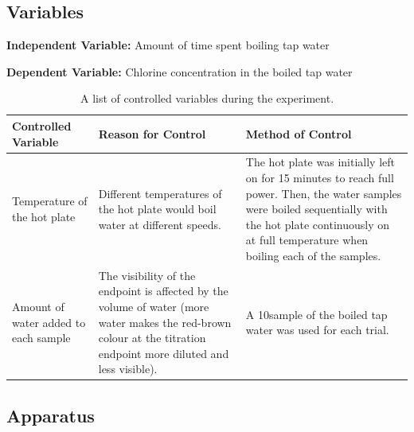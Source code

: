 \documentclass[11pt]{article}
\begin{document}
\subsection{Variables}

\textbf{Independent Variable:} Amount of time spent boiling tap water

\smallskip

\noindent\textbf{Dependent Variable:} Chlorine concentration in the boiled tap water

\begin{table}[H]
	\def\arraystretch{1.5}
	\caption{A list of controlled variables during the experiment.}
	\begin{tabularx}{\linewidth}{|
			>{\RaggedRight}X|
			>{\RaggedRight}X|
			>{\RaggedRight}X|
		}
		\hline
		\textbf{Controlled Variable}
		 & \textbf{Reason for Control}
		 & \textbf{Method of Control}
		\\\hline
		Temperature of the hot plate
		 & Different temperatures of the hot plate would boil water at different speeds.
		 & The hot plate was initially left on for 15 minutes to reach full power. Then, the water samples were boiled sequentially with the hot plate continuously on at full temperature when boiling each of the samples.
		\\\hline
		Amount of water added to each sample
		 & The visibility of the endpoint is affected by the volume of water (more water makes the red-brown colour at the titration endpoint more diluted and less visible).
		 & A 10\ml sample of the boiled tap water was used for each trial.
		\\\hline
	\end{tabularx}
\end{table}

\newpage

\subsection{Apparatus}
\end{document}
